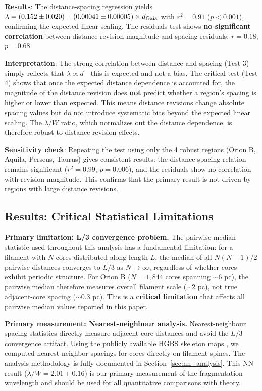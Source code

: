 \documentclass[twocolumn,usenatbib]{mnras}
\begin{document}
\textbf{Results}: The distance-spacing regression yields $\lambda = (0.152 \pm 0.020) + (0.00041 \pm 0.00005) \times d_{\rm Gaia}$ with $r^2 = 0.91$ ($p < 0.001$), confirming the expected linear scaling. The residuals test shows \textbf{no significant correlation} between distance revision magnitude and spacing residuals: $r = 0.18$, $p = 0.68$.

\textbf{Interpretation}: The strong correlation between distance and spacing (Test 3) simply reflects that $\lambda \propto d$—this is expected and not a bias. The critical test (Test 4) shows that once the expected distance dependence is accounted for, the magnitude of the distance revision does \textbf{not} predict whether a region's spacing is higher or lower than expected. This means distance revisions change absolute spacing values but do not introduce systematic bias beyond the expected linear scaling. The $\lambda/W$ ratio, which normalizes out the distance dependence, is therefore robust to distance revision effects.

\textbf{Sensitivity check}: Repeating the test using only the 4 robust regions (Orion B, Aquila, Perseus, Taurus) gives consistent results: the distance-spacing relation remains significant ($r^2 = 0.99$, $p = 0.006$), and the residuals show no correlation with revision magnitude. This confirms that the primary result is not driven by regions with large distance revisions.

\subsection{Results: Critical Statistical Limitations}

\textbf{Primary limitation: L/3 convergence problem.}
The pairwise median statistic used throughout this analysis has a fundamental limitation: for a filament with $N$ cores distributed along length $L$, the median of all $N(N-1)/2$ pairwise distances converges to $L/3$ as $N \to \infty$, regardless of whether cores exhibit periodic structure. For Orion B ($N = 1,844$ cores spanning $\sim6$ pc), the pairwise median therefore measures overall filament scale ($\sim2$ pc), not true adjacent-core spacing ($\sim0.3$ pc). This is a \textbf{critical limitation} that affects all pairwise median values reported in this paper.

\textbf{Primary measurement: Nearest-neighbour analysis.}
Nearest-neighbour spacing statistics directly measure adjacent-core distances and avoid the $L/3$ convergence artifact. Using the publicly available HGBS skeleton maps \citep{Andre2010}, we computed nearest-neighbor spacings for cores directly on filament spines. The analysis methodology is fully documented in Section~\ref{sec:nn_analysis}. This NN result ($\lambda/W = 2.01 \pm 0.16$) is our primary measurement of the fragmentation wavelength and should be used for all quantitative comparisons with theory.
\end{document}
